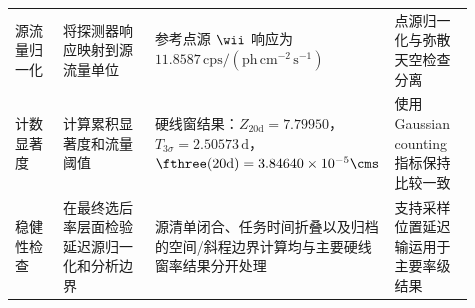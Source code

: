 \begin{table}[t]
\begin{tabular}{@{}p{0.12\linewidth}p{0.25\linewidth}p{0.36\linewidth}p{0.18\linewidth}@{}}
源流量归一化 & 将探测器响应映射到源流量单位 & 参考点源 $\wii$ 响应为 $11.8587\,\mathrm{cps}/(\mathrm{ph\,cm^{-2}\,s^{-1}})$ & 点源归一化与弥散天空检查分离 \\
计数显著度 & 计算累积显著度和流量阈值 & 硬线窗结果：$Z_{20\mathrm{d}}=7.79950$，$T_{3\sigma}=2.50573\,\mathrm{d}$，$\fthree(20\mathrm{d})=3.84640\times10^{-5}\cms$ & 使用 Gaussian counting 指标保持比较一致 \\
稳健性检查 & 在最终选后率层面检验延迟源归一化和分析边界 & 源清单闭合、任务时间折叠以及归档的空间/斜程边界计算均与主要硬线窗率结果分开处理 & 支持采样位置延迟输运用于主要率级结果 \\
\bottomrule
\end{tabular}
\endgroup
\end{table}
